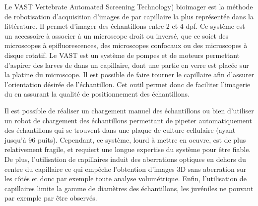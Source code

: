 \documentclass[\main/main.tex]{subfiles}
\begin{document}
\label{sec:vast}
Le VAST Vertebrate Automated Screening Technology) bioimager\cite{pardomartin_2010} est la méthode de robotisation d'acquisition d'images de \pz{} par capillaire la plus représentée dans la littérature\cite{jarque_2018,teixid_2019}. Il permet d'imager des échantillons entre 2 et 4 dpf.
%
Ce système est un accessoire à associer à un microscope droit ou inversé, que ce soiet des microscopes à epifluorescences, des microscopes confocaux ou des microscopes à disque rotatif\cite{early_2018, guo_2017}.
%
Le VAST est un système de pompes et de moteurs permettant d'aspirer des larves de \pz{} dans un capillaire, dont une partie en verre est placée sur la platine du microscope. 
%
Il est possible de faire tourner le capillaire afin d'assurer l'orientation désirée de l'échantillon.
%
Cet outil permet donc de faciliter l'imagerie du \pz{} en assurant la qualité de positionnement des échantillons.

%
Il est possible de réaliser un chargement manuel des échantillons ou bien d'utiliser un robot de chargement des échantillons permettant de pipeter automatiquement des échantillons qui se trouvent dans une plaque de culture cellulaire (ayant jusqu'à 96 puits).
%
Cependant, ce système, lourd à mettre en oeuvre, est de plus relativement fragile, et requiert une longue expertise du système pour être fiable.
De plus, l'utilisation de capillaires induit des aberrations optiques en dehors du centre du capillaire ce qui empêche l'obtention d'images 3D sans aberration sur les côtés et donc par exemple toute analyse volumétrique. Enfin, l'utilisation de capillaires limite la gamme de diamètres des échantillons, les juvéniles ne pouvant par exemple par être observés.
\end{document}
